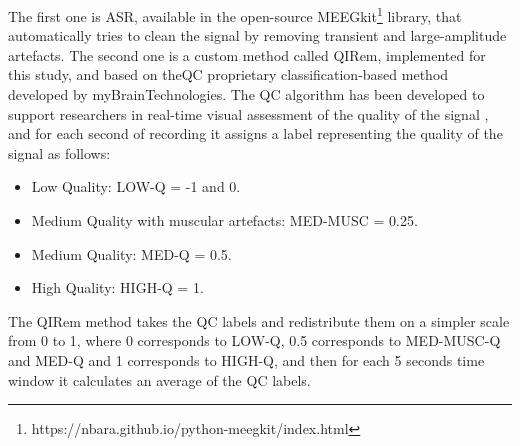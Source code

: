 The first one is  \ac{ASR}, available in the open-source MEEGkit\footnote{https://nbara.github.io/python-meegkit/index.html}  library, that automatically tries to clean the signal by removing transient and large-amplitude artefacts. The second one is a custom method called \ac{QIRem}, implemented for this study, and based on the\ac{QC} proprietary classification-based method developed by myBrainTechnologies. The \ac{QC} algorithm has been developed to support researchers in real-time visual assessment of the quality of the signal \cite{grosselin_quality_2019}, and for each second of recording it assigns a label representing the quality of the signal as follows:
\begin{itemize}
\item 	Low Quality: LOW-Q = -1 and 0. 
\item 	Medium Quality with muscular artefacts: MED-MUSC = 0.25. 
\item 	Medium Quality: MED-Q = 0.5. 
\item     High Quality: HIGH-Q = 1.
\end{itemize}

The \ac{QIRem} method takes the \ac{QC} labels and redistribute them on a simpler scale from 0 to 1, where 0 corresponds to LOW-Q, 0.5 corresponds to MED-MUSC-Q and MED-Q and 1 corresponds to HIGH-Q, and then for each 5 seconds time window it calculates an average of the \ac{QC} labels.

